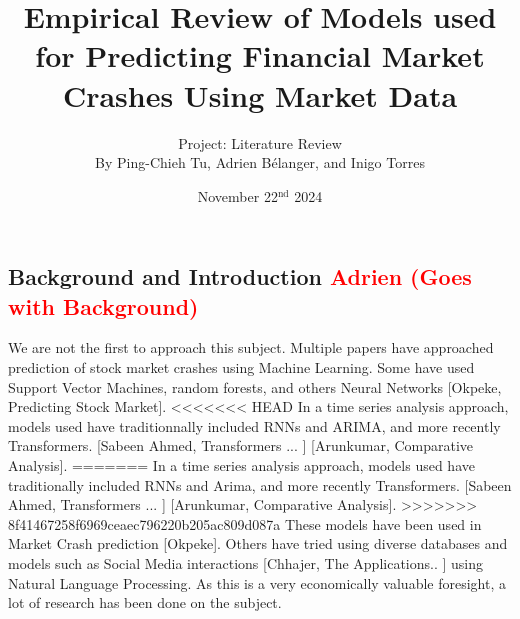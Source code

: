 \documentclass[12pt, letterpaper]{article}
\title{Empirical Review of Models used for Predicting Financial Market Crashes Using Market Data}
\author{\large Project: Literature Review \vspace{0.75em} \\ \normalsize By Ping-Chieh Tu, Adrien Bélanger, and Inigo Torres}
\date{November 22$^{\text{nd}}$ 2024}
\begin{document}
\maketitle 

\justifying %
\begin{comment}
Overall objective to keep in mind:

"In this milestone, the objective is to review the related literature to your proposal. This will better inform your methodology for your project if it involves a new idea, and it is necessary if you are comparing existing methods for a certain domain. It may even lead to a change of proposal, once you learn about existing methods out there. If you are producing a literature survey on a research topic, in this stage, you just provide a "breadth" review, in which you emphasize covering as many related works as possible and providing some preliminary organization without going into much detail."\\

Evaluation Criterias:

- Putting your proposal into context of related literature

- Coverage (are you adequately covering most relevant works)
\end{comment}
\subsection*{Background and Introduction \textcolor{red}{Adrien (Goes with Background)} }
We are not the first to approach this subject. 
Multiple papers have approached prediction of stock market crashes using Machine Learning. 
Some have used Support Vector Machines, random forests, and others Neural Networks [Okpeke, Predicting Stock Market]. 
<<<<<<< HEAD
In a time series analysis approach, models used have traditionnally included RNNs and ARIMA, and more recently Transformers. [Sabeen Ahmed, Transformers ... ] [Arunkumar, Comparative Analysis]. 
=======
In a time series analysis approach, models used have traditionally included RNNs and Arima, and more recently Transformers. [Sabeen Ahmed, Transformers ... ] [Arunkumar, Comparative Analysis]. 
>>>>>>> 8f41467258f6969ceaec796220b205ac809d087a
These models have been used in Market Crash prediction [Okpeke]. 
Others have tried using diverse databases and models such as Social Media interactions [Chhajer, The Applications.. ] using Natural Language Processing. As this is a very economically valuable foresight, a lot of research has been done on the subject.
\end{document}

